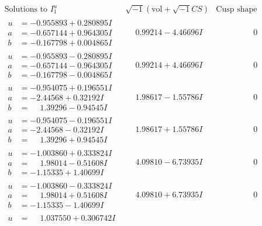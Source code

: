 \documentclass[1p]{elsarticle_modified}
\theoremstyle{definition}
\newcommand{\I}{\sqrt{-1}}
\begin{document}
$$\begin{array}{c|c|c}  
\text{Solutions to }I^u_{1}& \I (\text{vol} + \sqrt{-1}CS) & \text{Cusp shape}\\
 \hline 
\begin{aligned}
u &= -0.955893 + 0.280895 I \\
a &= -0.657144 + 0.964305 I \\
b &= -0.167798 + 0.004865 I\end{aligned}
 & \phantom{-}0.99214 - 4.46696 I & \phantom{-0.000000 } 0 \\ \hline\begin{aligned}
u &= -0.955893 - 0.280895 I \\
a &= -0.657144 - 0.964305 I \\
b &= -0.167798 - 0.004865 I\end{aligned}
 & \phantom{-}0.99214 + 4.46696 I & \phantom{-0.000000 } 0 \\ \hline\begin{aligned}
u &= -0.954075 + 0.196551 I \\
a &= -2.44568 + 0.32192 I \\
b &= \phantom{-}1.39296 - 0.94545 I\end{aligned}
 & \phantom{-}1.98617 - 1.55786 I & \phantom{-0.000000 } 0 \\ \hline\begin{aligned}
u &= -0.954075 - 0.196551 I \\
a &= -2.44568 - 0.32192 I \\
b &= \phantom{-}1.39296 + 0.94545 I\end{aligned}
 & \phantom{-}1.98617 + 1.55786 I & \phantom{-0.000000 } 0 \\ \hline\begin{aligned}
u &= -1.003860 + 0.333824 I \\
a &= \phantom{-}1.98014 - 0.51608 I \\
b &= -1.15335 + 1.40699 I\end{aligned}
 & \phantom{-}4.09810 - 6.73935 I & \phantom{-0.000000 } 0 \\ \hline\begin{aligned}
u &= -1.003860 - 0.333824 I \\
a &= \phantom{-}1.98014 + 0.51608 I \\
b &= -1.15335 - 1.40699 I\end{aligned}
 & \phantom{-}4.09810 + 6.73935 I & \phantom{-0.000000 } 0 \\ \hline\begin{aligned}
u &= \phantom{-}1.037550 + 0.306742 I \\

\end{aligned}
\end{array}$$
\end{document}
